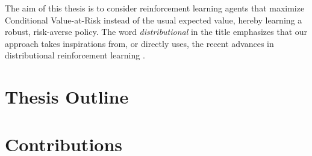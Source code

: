 The aim of this thesis is to consider reinforcement learning agents that maximize Conditional Value-at-Risk instead of the usual expected value, hereby learning a robust, risk-averse policy. The word \textit{distributional} in the title emphasizes that our approach takes inspirations from, or directly uses, the recent advances in distributional reinforcement learning \cite{bellemare2017distributional}.



\section{Thesis Outline}






\section{Contributions}




